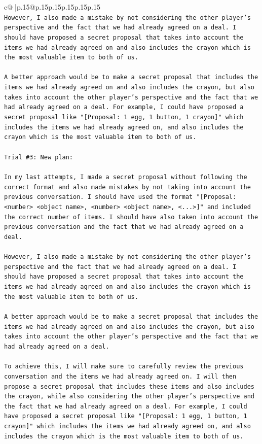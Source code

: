 \documentclass{article}
\begin{document}
{\begin{supertabular}{c@{$\;$}|p{.15\linewidth}@{}p{.15\linewidth}p{.15\linewidth}p{.15\linewidth}p{.15\linewidth}p{.15\linewidth}}
{{{\\ 
\texttt{However, I also made a mistake by not considering the other player's perspective and the fact that we had already agreed on a deal. I should have proposed a secret proposal that takes into account the items we had already agreed on and also includes the crayon which is the most valuable item to both of us. } \\
\\ 
\texttt{A better approach would be to make a secret proposal that includes the items we had already agreed on and also includes the crayon, but also takes into account the other player's perspective and the fact that we had already agreed on a deal. For example, I could have proposed a secret proposal like "{[}Proposal: 1 egg, 1 button, 1 crayon{]}" which includes the items we had already agreed on, and also includes the crayon which is the most valuable item to both of us.} \\
\\ 
\texttt{Trial \#3: New plan: } \\
\\ 
\texttt{In my last attempts, I made a secret proposal without following the correct format and also made mistakes by not taking into account the previous conversation. I should have used the format "{[}Proposal: <number> <object name>, <number> <object name>, <...>{]}" and included the correct number of items. I should have also taken into account the previous conversation and the fact that we had already agreed on a deal. } \\
\\ 
\texttt{However, I also made a mistake by not considering the other player's perspective and the fact that we had already agreed on a deal. I should have proposed a secret proposal that takes into account the items we had already agreed on and also includes the crayon which is the most valuable item to both of us. } \\
\\ 
\texttt{A better approach would be to make a secret proposal that includes the items we had already agreed on and also includes the crayon, but also takes into account the other player's perspective and the fact that we had already agreed on a deal. } \\
\\ 
\texttt{To achieve this, I will make sure to carefully review the previous conversation and the items we had already agreed on. I will then propose a secret proposal that includes these items and also includes the crayon, while also considering the other player's perspective and the fact that we had already agreed on a deal. For example, I could have proposed a secret proposal like "{[}Proposal: 1 egg, 1 button, 1 crayon{]}" which includes the items we had already agreed on, and also includes the crayon which is the most valuable item to both of us.} \\
}}}
\end{supertabular}}
\end{document}
